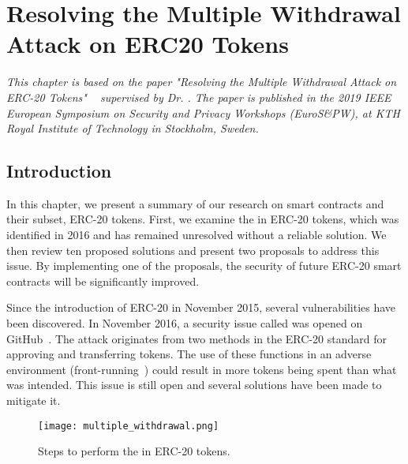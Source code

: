 
\chapter{Resolving the Multiple Withdrawal Attack on ERC20 Tokens}\label{ch:multiple}

\textit{This chapter is based on the paper "Resolving the Multiple Withdrawal Attack on ERC-20 Tokens" ~\cite{MultipleWithdrawal} supervised by Dr. \supv. The paper is published in the 2019 IEEE European Symposium on Security and Privacy Workshops (EuroS\&PW), at KTH Royal Institute of Technology in Stockholm, Sweden.}

\section{Introduction}
In this chapter, we present a summary of our research on smart contracts and their subset, ERC-20 tokens. First, we examine the \mwa in ERC-20 tokens, which was identified in 2016 and has remained unresolved without a reliable solution. We then review ten proposed solutions and present two proposals to address this issue. By implementing one of the proposals, the security of future ERC-20 smart contracts will be significantly improved.

Since the introduction of ERC-20 in November 2015, several vulnerabilities have been discovered. In November 2016, a security issue called \mwa was opened on GitHub~\cite{AttackVector,Resolution}. The attack originates from two methods in the ERC-20 standard for approving and transferring tokens. The use of these functions in an adverse environment (\eg front-running~\cite{eskandari2019sok}) could result in more tokens being spent than what was intended. This issue is still open and several solutions have been made to mitigate it.

\begin{figure}[t]
	\centering
	\texttt{[image: multiple\_withdrawal.png]}
	\caption{Steps to perform the \mwa in ERC-20 tokens.}
	\label{fig:mwa}
\end{figure}

